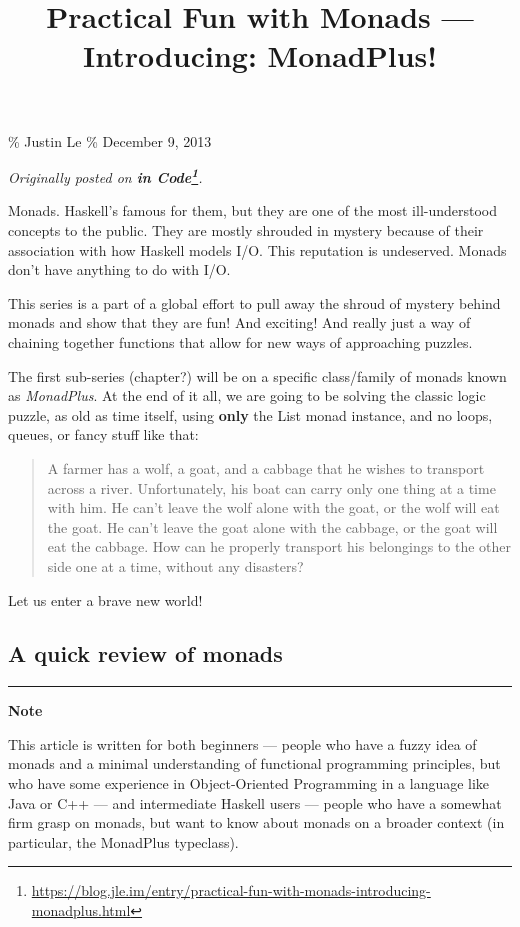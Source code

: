\documentclass[]{article}
\title{Practical Fun with Monads --- Introducing: MonadPlus!}
\renewcommand{\href}[2]{#2\footnote{\url{#1}}}
\begin{document}
\maketitle

\% Justin Le \% December 9, 2013

\emph{Originally posted on
\textbf{\href{https://blog.jle.im/entry/practical-fun-with-monads-introducing-monadplus.html}{in
Code}}.}

Monads. Haskell's famous for them, but they are one of the most ill-understood
concepts to the public. They are mostly shrouded in mystery because of their
association with how Haskell models I/O. This reputation is undeserved. Monads
don't have anything to do with I/O.

This series is a part of a global effort to pull away the shroud of mystery
behind monads and show that they are fun! And exciting! And really just a way of
chaining together functions that allow for new ways of approaching puzzles.

The first sub-series (chapter?) will be on a specific class/family of monads
known as \emph{MonadPlus}. At the end of it all, we are going to be solving the
classic logic puzzle, as old as time itself, using \textbf{only} the List monad
instance, and no loops, queues, or fancy stuff like that:

\begin{quote}
A farmer has a wolf, a goat, and a cabbage that he wishes to transport across a
river. Unfortunately, his boat can carry only one thing at a time with him. He
can't leave the wolf alone with the goat, or the wolf will eat the goat. He
can't leave the goat alone with the cabbage, or the goat will eat the cabbage.
How can he properly transport his belongings to the other side one at a time,
without any disasters?
\end{quote}

Let us enter a brave new world!

\subsection{A quick review of monads}\label{a-quick-review-of-monads}

\begin{center}\rule{0.5\linewidth}{0.5pt}\end{center}

\textbf{Note}

This article is written for both beginners --- people who have a fuzzy idea of
monads and a minimal understanding of functional programming principles, but who
have some experience in Object-Oriented Programming in a language like Java or
C++ --- and intermediate Haskell users --- people who have a somewhat firm grasp
on monads, but want to know about monads on a broader context (in particular,
the MonadPlus typeclass).
\end{document}
